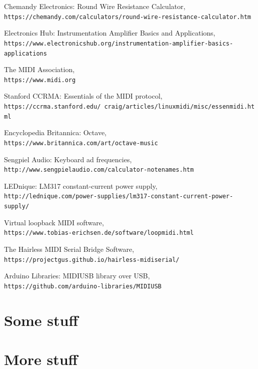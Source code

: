 \documentclass{article}
\begin{document}
\newpage
\begin{thebibliography}{9}

Chemandy Electronics: Round Wire Resistance Calculator,
\\\texttt{https://chemandy.com/calculators/round-wire-resistance-calculator.htm}

Electronics Hub: Instrumentation Amplifier Basics and Applications,
\\\texttt{https://www.electronicshub.org/instrumentation-amplifier-basics-applications}

The MIDI Association,
\\\texttt{https://www.midi.org}

Stanford CCRMA: Essentials of the MIDI protocol,
\\\texttt{https://ccrma.stanford.edu/~craig/articles/linuxmidi/misc/essenmidi.html}

Encyclopedia Britannica: Octave,
\\\texttt{https://www.britannica.com/art/octave-music}

Sengpiel Audio: Keyboard ad frequencies,
\\\texttt{http://www.sengpielaudio.com/calculator-notenames.htm}

LEDnique: LM317 constant-current power supply,
\\\texttt{http://lednique.com/power-supplies/lm317-constant-current-power-supply/}

Virtual loopback MIDI software,
\\\texttt{https://www.tobias-erichsen.de/software/loopmidi.html}

The Hairless MIDI Serial Bridge Software,
\\\texttt{https://projectgus.github.io/hairless-midiserial/}

Arduino Libraries: MIDIUSB library over USB,
\\\texttt{https://github.com/arduino-libraries/MIDIUSB}

\end{thebibliography}

\newpage
\begin{appendices}

\section{Some stuff}

\section {More stuff}

\end{appendices}
\end{document}
